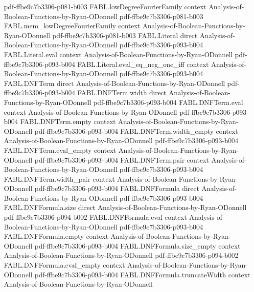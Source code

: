 \begin{theorem}
  {pdf-ffbe9c7b3306-p081-b003}
\proofstep
  {FABL.lowDegreeFourierFamily}
  {context}
  {Analysis-of-Boolean-Functions-by-Ryan-ODonnell}
  {pdf-ffbe9c7b3306-p081-b003}
\proofstep
  {FABL.mem_lowDegreeFourierFamily}
  {context}
  {Analysis-of-Boolean-Functions-by-Ryan-ODonnell}
  {pdf-ffbe9c7b3306-p081-b003}
\proofstep
  {FABL.Literal}
  {direct}
  {Analysis-of-Boolean-Functions-by-Ryan-ODonnell}
  {pdf-ffbe9c7b3306-p093-b004}
\proofstep
  {FABL.Literal.eval}
  {context}
  {Analysis-of-Boolean-Functions-by-Ryan-ODonnell}
  {pdf-ffbe9c7b3306-p093-b004}
\proofstep
  {FABL.Literal.eval_eq_neg_one_iff}
  {context}
  {Analysis-of-Boolean-Functions-by-Ryan-ODonnell}
  {pdf-ffbe9c7b3306-p093-b004}
\proofstep
  {FABL.DNFTerm}
  {direct}
  {Analysis-of-Boolean-Functions-by-Ryan-ODonnell}
  {pdf-ffbe9c7b3306-p093-b004}
\proofstep
  {FABL.DNFTerm.width}
  {direct}
  {Analysis-of-Boolean-Functions-by-Ryan-ODonnell}
  {pdf-ffbe9c7b3306-p093-b004}
\proofstep
  {FABL.DNFTerm.eval}
  {context}
  {Analysis-of-Boolean-Functions-by-Ryan-ODonnell}
  {pdf-ffbe9c7b3306-p093-b004}
\proofstep
  {FABL.DNFTerm.empty}
  {context}
  {Analysis-of-Boolean-Functions-by-Ryan-ODonnell}
  {pdf-ffbe9c7b3306-p093-b004}
\proofstep
  {FABL.DNFTerm.width_empty}
  {context}
  {Analysis-of-Boolean-Functions-by-Ryan-ODonnell}
  {pdf-ffbe9c7b3306-p093-b004}
\proofstep
  {FABL.DNFTerm.eval_empty}
  {context}
  {Analysis-of-Boolean-Functions-by-Ryan-ODonnell}
  {pdf-ffbe9c7b3306-p093-b004}
\proofstep
  {FABL.DNFTerm.pair}
  {context}
  {Analysis-of-Boolean-Functions-by-Ryan-ODonnell}
  {pdf-ffbe9c7b3306-p093-b004}
\proofstep
  {FABL.DNFTerm.width_pair}
  {context}
  {Analysis-of-Boolean-Functions-by-Ryan-ODonnell}
  {pdf-ffbe9c7b3306-p093-b004}
\proofstep
  {FABL.DNFFormula}
  {direct}
  {Analysis-of-Boolean-Functions-by-Ryan-ODonnell}
  {pdf-ffbe9c7b3306-p093-b004}
\proofstep
  {FABL.DNFFormula.size}
  {direct}
  {Analysis-of-Boolean-Functions-by-Ryan-ODonnell}
  {pdf-ffbe9c7b3306-p094-b002}
\proofstep
  {FABL.DNFFormula.eval}
  {context}
  {Analysis-of-Boolean-Functions-by-Ryan-ODonnell}
  {pdf-ffbe9c7b3306-p093-b004}
\proofstep
  {FABL.DNFFormula.empty}
  {context}
  {Analysis-of-Boolean-Functions-by-Ryan-ODonnell}
  {pdf-ffbe9c7b3306-p093-b004}
\proofstep
  {FABL.DNFFormula.size_empty}
  {context}
  {Analysis-of-Boolean-Functions-by-Ryan-ODonnell}
  {pdf-ffbe9c7b3306-p094-b002}
\proofstep
  {FABL.DNFFormula.eval_empty}
  {context}
  {Analysis-of-Boolean-Functions-by-Ryan-ODonnell}
  {pdf-ffbe9c7b3306-p093-b004}
\proofstep
  {FABL.DNFFormula.truncateWidth}
  {context}
  {Analysis-of-Boolean-Functions-by-Ryan-ODonnell}

\end{theorem}
